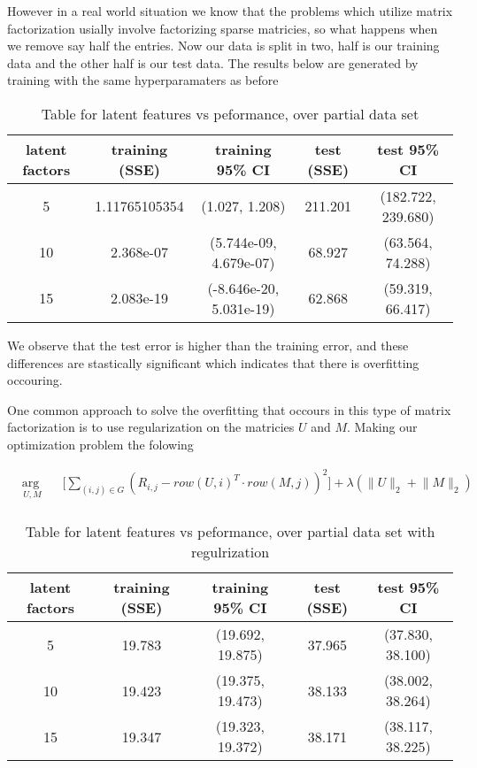 \documentclass{article}
\begin{document}
However in a real world situation we know that the problems which utilize matrix factorization usially involve factorizing sparse matricies, so what happens when we remove say half the entries. Now our data is split in two, half is our training data and the other half is our test data. The results below are generated by training with the same hyperparamaters as before

\begin{table}[H]
\centering
\begin{tabular}{| c | c | c | c | c |}
\hline
latent factors & training (SSE) &  training 95\% CI & test (SSE) &  test 95\% CI  \\
\hline
\hline
5 & 1.11765105354 & (1.027, 1.208) & 211.201 & (182.722, 239.680)\\
10 & 2.368e-07 & (5.744e-09, 4.679e-07) & 68.927 & (63.564, 74.288)\\
15 & 2.083e-19 & (-8.646e-20, 5.031e-19) & 62.868 & (59.319, 66.417)\\
\hline
\end{tabular}
\caption{Table for latent features vs peformance, over partial data set}
\end{table}

We observe that the test error is higher than the training error, and these differences are stastically significant which indicates that there is overfitting occouring.

One common approach to solve the overfitting that occours in this type of matrix factorization is to use regularization on the matricies $U$ and $M$. Making our optimization problem the folowing

\begin{equation*}
\begin{aligned}
& \underset{U, M}{\text{arg min}}
& & \big[ \sum_{(i,j) \in G} (R_{i,j} - row(U, i)^T \cdot row(M, j))^2 \big] + \lambda (\lVert U \lVert_2 + \lVert M \lVert_2)\\
\end{aligned}
\end{equation*}

\begin{table}[H]
\centering
\begin{tabular}{| c | c | c | c | c |}
\hline
latent factors & training (SSE) &  training 95\% CI & test (SSE) &  test 95\% CI  \\
\hline
\hline
5 & 19.783 & (19.692, 19.875)& 37.965 & (37.830, 38.100)\\
10 & 19.423 & (19.375, 19.473) & 38.133 & (38.002, 38.264)\\
15 & 19.347 & (19.323, 19.372) & 38.171 & (38.117, 38.225)\\
\hline
\end{tabular}
\caption{Table for latent features vs peformance, over partial data set with regulrization}
\end{table}
\end{document}
